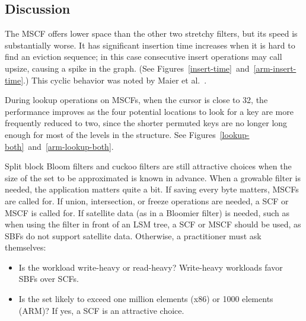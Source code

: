 \documentclass[letterpaper,twocolumn,10pt]{article}
\newcommand{\etal}{et al.}
\newcommand{\taffy}{stretchy}
\newcommand{\TBF}{SBF}
\newcommand{\TCF}{SCF}
\newcommand{\MTCF}{MSCF}
\newcommand{\taffy}{taffy}
\newcommand{\TBF}{TBF}
\newcommand{\TCF}{TCF}
\newcommand{\MTCF}{MTCF}
\begin{document}


\subsection{Discussion}

The \MTCF{} offers lower space than the other two \taffy{} filters, but its speed is substantially worse.
It has significant insertion time increases when it is hard to find an eviction sequence; in this case consecutive insert operations may call upsize, causing a spike in the graph. (See Figures~\ref{insert-time}~and~\ref{arm-insert-time}.)
This cyclic behavior was noted by Maier \etal~\cite{dysect}.

During lookup operations on \MTCF{}s, when the cursor is close to 32, the performance improves as the four potential locations to look for a key are more frequently reduced to two, since the shorter permuted keys are no longer long enough for most of the levels in the structure.
See Figures~\ref{lookup-both}~and~\ref{arm-lookup-both}.

Split block Bloom filters and cuckoo filters are still attractive choices when the size of the set to be approximated is known in advance.
When a growable filter is needed, the application matters quite a bit.
If saving every byte matters, \MTCF{}s are called for.
If union, intersection, or freeze operations are needed, a \TCF{} or \MTCF{} is called for.
If satellite data (as in a Bloomier filter) is needed, such as when using the filter in front of an LSM tree, a \TCF{} or \MTCF{} should be used, as \TBF{}s do not support satellite data.
Otherwise, a practitioner must ask themselves:

\begin{itemize}
\item Is the workload write-heavy or read-heavy?
  Write-heavy workloads favor \TBF{}s over \TCF{}s.
\item Is the set likely to exceed one million elements (x86) or 1000 elements (ARM)?
  If yes, a \TCF{} is an attractive choice.
\end{itemize}
\end{document}
